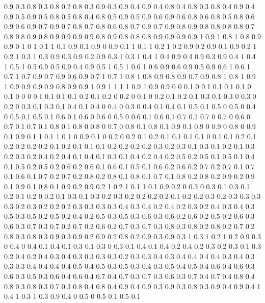 0.9 0.3
0.8 0.3
0.8 0.2
0.8 0.3
0.9 0.3
0.9 0.4
0.9 0.4
0.8 0.4
0.8 0.3
0.8 0.4
0.9 0.4
0.9 0.5
0.9 0.5
0.8 0.5
0.8 0.4
0.8 0.5
0.9 0.5
0.9 0.6
0.9 0.6
0.8 0.6
0.8 0.5
0.8 0.6
0.9 0.6
0.9 0.7
0.9 0.7
0.8 0.7
0.8 0.6
0.8 0.7
0.9 0.7
0.9 0.8
0.9 0.8
0.8 0.8
0.8 0.7
0.8 0.8
0.9 0.8
0.9 0.9
0.9 0.9
0.8 0.9
0.8 0.8
0.8 0.9
0.9 0.9
0.9 1
0.9 1
0.8 1
0.8 0.9
0.9 0
1 0
1 0.1
1 0.1
0.9 0.1
0.9 0
0.9 0.1
1 0.1
1 0.2
1 0.2
0.9 0.2
0.9 0.1
0.9 0.2
1 0.2
1 0.3
1 0.3
0.9 0.3
0.9 0.2
0.9 0.3
1 0.3
1 0.4
1 0.4
0.9 0.4
0.9 0.3
0.9 0.4
1 0.4
1 0.5
1 0.5
0.9 0.5
0.9 0.4
0.9 0.5
1 0.5
1 0.6
1 0.6
0.9 0.6
0.9 0.5
0.9 0.6
1 0.6
1 0.7
1 0.7
0.9 0.7
0.9 0.6
0.9 0.7
1 0.7
1 0.8
1 0.8
0.9 0.8
0.9 0.7
0.9 0.8
1 0.8
1 0.9
1 0.9
0.9 0.9
0.9 0.8
0.9 0.9
1 0.9
1 1
1 1
0.9 1
0.9 0.9
0 0
0.1 0
0.1 0.1
0.1 0.1
0 0.1
0 0
0 0.1
0.1 0.1
0.1 0.2
0.1 0.2
0 0.2
0 0.1
0 0.2
0.1 0.2
0.1 0.3
0.1 0.3
0 0.3
0 0.2
0 0.3
0.1 0.3
0.1 0.4
0.1 0.4
0 0.4
0 0.3
0 0.4
0.1 0.4
0.1 0.5
0.1 0.5
0 0.5
0 0.4
0 0.5
0.1 0.5
0.1 0.6
0.1 0.6
0 0.6
0 0.5
0 0.6
0.1 0.6
0.1 0.7
0.1 0.7
0 0.7
0 0.6
0 0.7
0.1 0.7
0.1 0.8
0.1 0.8
0 0.8
0 0.7
0 0.8
0.1 0.8
0.1 0.9
0.1 0.9
0 0.9
0 0.8
0 0.9
0.1 0.9
0.1 1
0.1 1
0 1
0 0.9
0.1 0
0.2 0
0.2 0.1
0.2 0.1
0.1 0.1
0.1 0
0.1 0.1
0.2 0.1
0.2 0.2
0.2 0.2
0.1 0.2
0.1 0.1
0.1 0.2
0.2 0.2
0.2 0.3
0.2 0.3
0.1 0.3
0.1 0.2
0.1 0.3
0.2 0.3
0.2 0.4
0.2 0.4
0.1 0.4
0.1 0.3
0.1 0.4
0.2 0.4
0.2 0.5
0.2 0.5
0.1 0.5
0.1 0.4
0.1 0.5
0.2 0.5
0.2 0.6
0.2 0.6
0.1 0.6
0.1 0.5
0.1 0.6
0.2 0.6
0.2 0.7
0.2 0.7
0.1 0.7
0.1 0.6
0.1 0.7
0.2 0.7
0.2 0.8
0.2 0.8
0.1 0.8
0.1 0.7
0.1 0.8
0.2 0.8
0.2 0.9
0.2 0.9
0.1 0.9
0.1 0.8
0.1 0.9
0.2 0.9
0.2 1
0.2 1
0.1 1
0.1 0.9
0.2 0
0.3 0
0.3 0.1
0.3 0.1
0.2 0.1
0.2 0
0.2 0.1
0.3 0.1
0.3 0.2
0.3 0.2
0.2 0.2
0.2 0.1
0.2 0.2
0.3 0.2
0.3 0.3
0.3 0.3
0.2 0.3
0.2 0.2
0.2 0.3
0.3 0.3
0.3 0.4
0.3 0.4
0.2 0.4
0.2 0.3
0.2 0.4
0.3 0.4
0.3 0.5
0.3 0.5
0.2 0.5
0.2 0.4
0.2 0.5
0.3 0.5
0.3 0.6
0.3 0.6
0.2 0.6
0.2 0.5
0.2 0.6
0.3 0.6
0.3 0.7
0.3 0.7
0.2 0.7
0.2 0.6
0.2 0.7
0.3 0.7
0.3 0.8
0.3 0.8
0.2 0.8
0.2 0.7
0.2 0.8
0.3 0.8
0.3 0.9
0.3 0.9
0.2 0.9
0.2 0.8
0.2 0.9
0.3 0.9
0.3 1
0.3 1
0.2 1
0.2 0.9
0.3 0
0.4 0
0.4 0.1
0.4 0.1
0.3 0.1
0.3 0
0.3 0.1
0.4 0.1
0.4 0.2
0.4 0.2
0.3 0.2
0.3 0.1
0.3 0.2
0.4 0.2
0.4 0.3
0.4 0.3
0.3 0.3
0.3 0.2
0.3 0.3
0.4 0.3
0.4 0.4
0.4 0.4
0.3 0.4
0.3 0.3
0.3 0.4
0.4 0.4
0.4 0.5
0.4 0.5
0.3 0.5
0.3 0.4
0.3 0.5
0.4 0.5
0.4 0.6
0.4 0.6
0.3 0.6
0.3 0.5
0.3 0.6
0.4 0.6
0.4 0.7
0.4 0.7
0.3 0.7
0.3 0.6
0.3 0.7
0.4 0.7
0.4 0.8
0.4 0.8
0.3 0.8
0.3 0.7
0.3 0.8
0.4 0.8
0.4 0.9
0.4 0.9
0.3 0.9
0.3 0.8
0.3 0.9
0.4 0.9
0.4 1
0.4 1
0.3 1
0.3 0.9
0.4 0
0.5 0
0.5 0.1
0.5 0.1
